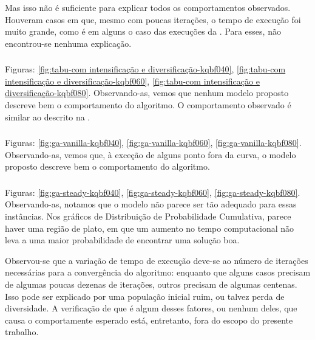 Mas isso não é suficiente para explicar todos os comportamentos observados. Houveram casos em que, mesmo com poucas iterações, o tempo de execução foi muito grande, como é em alguns o caso das execuções da . Para esses, não encontrou-se nenhuma explicação.

\subsubsection{\tabuMod}
\label{subsubsection:ttt-validation-tabu-mod}

Figuras: \ref{fig:tabu-com intensificação e diversificação-kqbf040}, \ref{fig:tabu-com intensificação e diversificação-kqbf060},
\ref{fig:tabu-com intensificação e diversificação-kqbf080}. Observando-as, vemos que nenhum modelo proposto descreve bem o comportamento do algoritmo. O comportamento observado é similar ao descrito na .

\subsubsection{\geneticVanilla}
\label{subsubsection:ttt-validation-ga-vanilla}

Figuras: \ref{fig:ga-vanilla-kqbf040}, \ref{fig:ga-vanilla-kqbf060},
\ref{fig:ga-vanilla-kqbf080}. Observando-as, vemos que, à exceção de alguns ponto fora da curva, o modelo proposto descreve bem o comportamento do algoritmo.

\subsubsection{\geneticSteady}
\label{subsubsection:ttt-validation-ga-steady}

Figuras: \ref{fig:ga-steady-kqbf040}, \ref{fig:ga-steady-kqbf060},
\ref{fig:ga-steady-kqbf080}. Observando-as, notamos que o modelo não parece ser tão adequado para essas instâncias. Nos gráficos de Distribuição de Probabilidade Cumulativa, parece haver uma região de plato, em que um aumento no tempo computacional não leva a uma maior probabilidade de encontrar uma solução boa.

Observou-se que a variação de tempo de execução deve-se ao número de iterações necessárias para a convergência do algoritmo: enquanto que alguns casos precisam de algumas poucas dezenas de iterações, outros precisam de algumas centenas. Isso pode ser explicado por uma população inicial ruim, ou talvez perda de diversidade. A verificação de que é algum desses fatores, ou nenhum deles, que causa o comportamente esperado está, entretanto, fora do escopo do presente trabalho.

